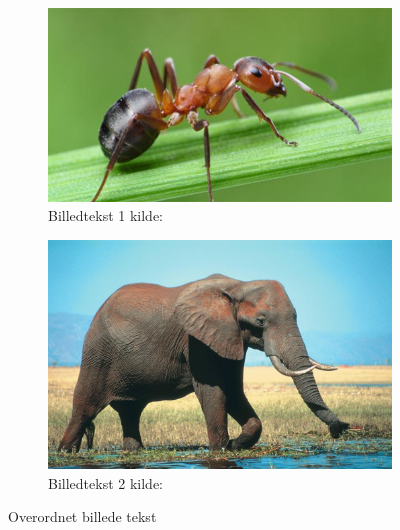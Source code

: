 \documentclass{article}
\begin{document}
\begin{figure}[H]
  \begin{subfigure}[b]{0.5\textwidth}
    \includegraphics[width=\textwidth]{figures/myre} %
    \caption{Billedtekst 1 kilde: \cite{myre}} %
    \label{fig:myre} %
  \end{subfigure}
  \hfill
  \begin{subfigure}[b]{0.5\textwidth}
    \includegraphics[width=\textwidth]{figures/elefant} %
    \caption{Billedtekst 2 kilde: \cite{elefant}} %
    \label{fig:elefant} %
  \end{subfigure}
  \caption{Overordnet billede tekst\cite{myre_elefant}} %
\end{figure}
\end{document}
